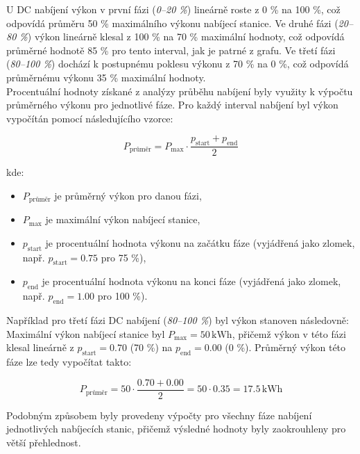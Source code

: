 \documentclass[a4paper,11pt]{article}
\begin{document}
U DC nabíjení výkon v první fázi (\textit{0–20 \%}) lineárně roste z 0 \% na 100 \%, což odpovídá průměru 50 \% maximálního výkonu nabíjecí stanice. Ve druhé fázi (\textit{20–80 \%}) výkon lineárně klesal z 100 \% na 70 \% maximální hodnoty, což odpovídá průměrné hodnotě 85 \% pro tento interval, jak je patrné z grafu. Ve třetí fázi (\textit{80–100 \%}) dochází k postupnému poklesu výkonu z 70 \% na 0 \%, což odpovídá průměrnému výkonu 35 \% maximální hodnoty.\\

Procentuální hodnoty získané z analýzy průběhu nabíjení byly využity k výpočtu průměrného výkonu pro jednotlivé fáze. Pro každý interval nabíjení byl výkon vypočítán pomocí následujícího vzorce:

\[
P_{\text{průměr}} = P_{\text{max}} \cdot \frac{p_{\text{start}} + p_{\text{end}}}{2}
\]

kde:
\begin{itemize}
    \item \(P_{\text{průměr}}\) je průměrný výkon pro danou fázi,
    \item \(P_{\text{max}}\) je maximální výkon nabíjecí stanice,
    \item \(p_{\text{start}}\) je procentuální hodnota výkonu na začátku fáze (vyjádřená jako zlomek, např. \(p_{\text{start}} = 0.75\) pro 75 \%),
    \item \(p_{\text{end}}\) je procentuální hodnota výkonu na konci fáze (vyjádřená jako zlomek, např. \(p_{\text{end}} = 1.00\) pro 100 \%).\\
\end{itemize}

Například pro třetí fázi DC nabíjení (\textit{80–100 \%}) byl výkon stanoven následovně: \\

Maximální výkon nabíjecí stanice byl \(P_{\text{max}} = 50 \, \mathrm{kWh}\), přičemž výkon v této fázi klesal lineárně z \(p_{\text{start}} = 0.70\) (70 \%) na \(p_{\text{end}} = 0.00\) (0 \%). Průměrný výkon této fáze lze tedy vypočítat takto:

\[
P_{\text{průměr}} = 50 \cdot \frac{0.70 + 0.00}{2} = 50 \cdot 0.35 = 17.5 \, \mathrm{kWh}
\]

Podobným způsobem byly provedeny výpočty pro všechny fáze nabíjení jednotlivých nabíjecích stanic, přičemž výsledné hodnoty byly zaokrouhleny pro větší přehlednost.
\end{document}
